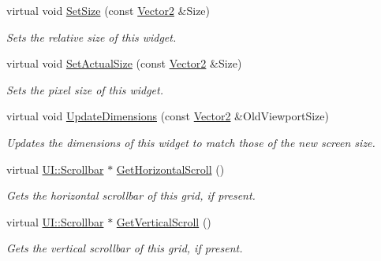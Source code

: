 \begin{DoxyCompactItemize}
virtual void \hyperlink{classphys_1_1UI_1_1ScrolledCellGrid_a793a775a3603e71db5ad29686c27ae68}{SetSize} (const \hyperlink{classphys_1_1Vector2}{Vector2} \&Size)
\begin{DoxyCompactList}\small\item\em Sets the relative size of this widget. \item\end{DoxyCompactList}\item 
virtual void \hyperlink{classphys_1_1UI_1_1ScrolledCellGrid_a32ee6cc683f7357afef8b7075d8b8f20}{SetActualSize} (const \hyperlink{classphys_1_1Vector2}{Vector2} \&Size)
\begin{DoxyCompactList}\small\item\em Sets the pixel size of this widget. \item\end{DoxyCompactList}\item 
virtual void \hyperlink{classphys_1_1UI_1_1ScrolledCellGrid_aed1f61cbdab04c555e26076ec933bbf2}{UpdateDimensions} (const \hyperlink{classphys_1_1Vector2}{Vector2} \&OldViewportSize)
\begin{DoxyCompactList}\small\item\em Updates the dimensions of this widget to match those of the new screen size. \item\end{DoxyCompactList}\item 
virtual \hyperlink{classphys_1_1UI_1_1Scrollbar}{UI::Scrollbar} $\ast$ \hyperlink{classphys_1_1UI_1_1ScrolledCellGrid_a32bad5e7312430285d93a9beee06a12b}{GetHorizontalScroll} ()
\begin{DoxyCompactList}\small\item\em Gets the horizontal scrollbar of this grid, if present. \item\end{DoxyCompactList}\item 
virtual \hyperlink{classphys_1_1UI_1_1Scrollbar}{UI::Scrollbar} $\ast$ \hyperlink{classphys_1_1UI_1_1ScrolledCellGrid_afcc80eceed64b8dac28832d4effade31}{GetVerticalScroll} ()
\begin{DoxyCompactList}\small\item\em Gets the vertical scrollbar of this grid, if present. \item\end{DoxyCompactList}\end{DoxyCompactItemize}
